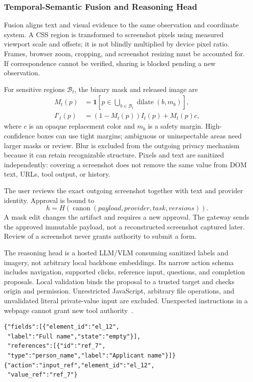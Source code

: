 \documentclass[conference]{IEEEtran}
\begin{document}
\subsubsection{Temporal-Semantic Fusion and Reasoning Head}
Fusion aligns text and visual evidence to the same observation and coordinate system. A CSS region is transformed to screenshot pixels using measured viewport scale and offsets; it is not blindly multiplied by device pixel ratio. Frames, browser zoom, cropping, and screenshot resizing must be accounted for. If correspondence cannot be verified, sharing is blocked pending a new observation.

For sensitive regions $\mathcal{B}_t$, the binary mask and released image are
\begin{align}
 M_t(p)&=\mathbf{1}\left[p\in\bigcup_{b\in\mathcal{B}_t}\operatorname{dilate}(b,m_b)\right],\\
 I'_t(p)&=(1-M_t(p))I_t(p)+M_t(p)c,
\end{align}
where $c$ is an opaque replacement color and $m_b$ is a safety margin. High-confidence boxes can use tight margins; ambiguous or uninspectable areas need larger masks or review. Blur is excluded from the outgoing privacy mechanism because it can retain recognizable structure. Pixels and text are sanitized independently: covering a screenshot does not remove the same value from DOM text, URLs, tool output, or history.

The user reviews the exact outgoing screenshot together with text and provider identity. Approval is bound to
\begin{equation}
 h=H(\operatorname{canon}(payload,provider,task,versions)).
\end{equation}
A mask edit changes the artifact and requires a new approval. The gateway sends the approved immutable payload, not a reconstructed screenshot captured later. Review of a screenshot never grants authority to submit a form.

The reasoning head is a hosted LLM/VLM consuming sanitized labels and imagery, not arbitrary local backbone embeddings. Its narrow action schema includes navigation, supported clicks, reference input, questions, and completion proposals. Local validation binds the proposal to a trusted target and checks origin and permission. Unrestricted JavaScript, arbitrary file operations, and unvalidated literal private-value input are excluded. Unexpected instructions in a webpage cannot grant new tool authority~\cite{injection}.

\begin{lstlisting}[caption={Illustrative sanitized observation and action proposal. Values are resolved locally, outside model context.},label={lst:ref}]
{"fields":[{"element_id":"el_12",
 "label":"Full name","state":"empty"}],
 "references":[{"id":"ref_7",
 "type":"person_name","label":"Applicant name"}]}
{"action":"input_ref","element_id":"el_12",
 "value_ref":"ref_7"}
\end{lstlisting}
\end{document}
